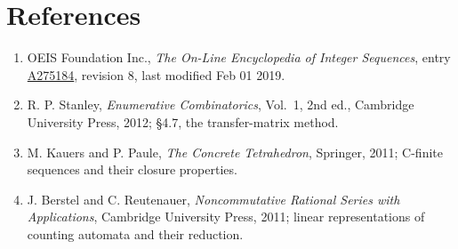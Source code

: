 \documentclass[11pt]{article}
\theoremstyle{definition}
\begin{document}
\section{References}

\begin{enumerate}

\item OEIS Foundation Inc., \emph{The On-Line Encyclopedia of Integer Sequences}, entry \href{https://oeis.org/A275184}{A275184}, revision 8, last modified Feb 01 2019.

\item R. P. Stanley, \emph{Enumerative Combinatorics}, Vol.~1, 2nd ed., Cambridge University Press, 2012; \S4.7, the transfer-matrix method.

\item M. Kauers and P. Paule, \emph{The Concrete Tetrahedron}, Springer, 2011; C-finite sequences and their closure properties.

\item J. Berstel and C. Reutenauer, \emph{Noncommutative Rational Series with Applications}, Cambridge University Press, 2011; linear representations of counting automata and their reduction.

\end{enumerate}
\end{document}
